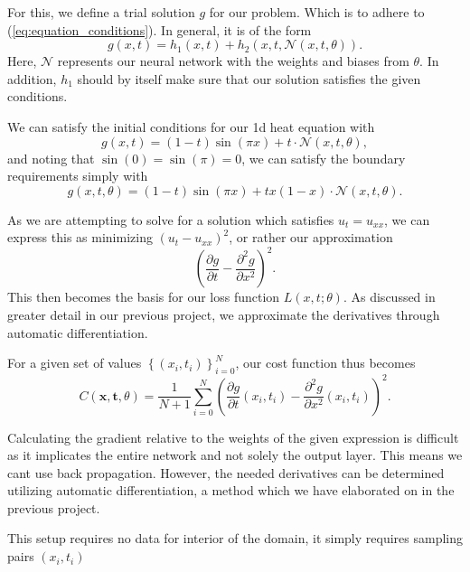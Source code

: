 \documentclass{article}
\theoremstyle{definition}
\begin{document}
For this, we define a trial solution $g$ for our problem. Which is to adhere to (\ref{eq:equation_conditions}). In general, it is of the form
\begin{equation*}
    g(x, t) = h_1(x, t) + h_2(x, t, \mathcal{N}(x, t, \theta)).
\end{equation*}
Here, $\mathcal{N}$ represents our neural network with the weights and biases from $\theta$. In addition, $h_1$ should by itself make sure that our solution satisfies the given conditions.

We can satisfy the initial conditions for our 1d heat equation with
\begin{equation*}
    g(x, t) = (1 - t) \sin(\pi x) + t \cdot \mathcal{N}(x, t, \theta),
\end{equation*}
and noting that $\sin(0) = \sin(\pi) = 0$, we can satisfy the boundary requirements simply with
\begin{equation*}
    g(x, t, \theta) = (1 - t) \sin(\pi x) + tx (1 - x) \cdot \mathcal{N}(x, t, \theta).
\end{equation*}

As we are attempting to solve for a solution which satisfies $u_t = u_{xx}$, we can express this as minimizing $\left(u_t - u_{xx}\right)^2$, or rather our approximation
\begin{equation*}
    \left( \frac{\partial g}{\partial t} - \frac{\partial^2 g}{\partial x^2} \right)^2.
\end{equation*}
This then becomes the basis for our loss function $L(x, t; \theta)$. As discussed in greater detail in our previous project, we approximate the derivatives through automatic differentiation.

For a given set of values $\left\{ (x_i, t_i) \right\}_{i=0}^{N}$, our cost function thus becomes
\begin{equation*}
    C(\boldsymbol{x}, \boldsymbol{t}, \theta) = \frac{1}{N + 1} \sum_{i=0}^N \left( \frac{\partial g}{\partial t}(x_i, t_i) - \frac{\partial^2 g}{\partial x^2}(x_i, t_i) \right)^2.
\end{equation*}

Calculating the gradient relative to the weights of the given expression is difficult as it implicates the entire network and not solely the output layer. This means we cant use back propagation. However, the needed derivatives can be determined utilizing automatic differentiation, a method which we have elaborated on in the previous project.

This setup requires no data for interior of the domain, it simply requires sampling pairs $(x_i, t_i)$
\end{document}
